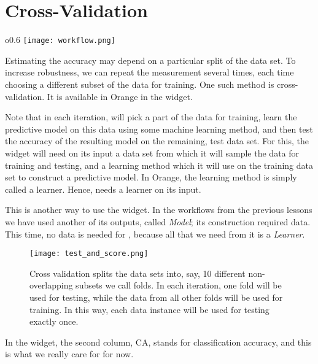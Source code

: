 \chapter{Cross-Validation}

\begin{wrapfigure}{o}{0.6\textwidth}
    \vspace{-0.5cm}
    \texttt{[image: workflow.png]}
\end{wrapfigure}

Estimating the accuracy may depend on a particular split of the data set. To increase robustness, we can repeat the measurement several times, each time choosing a different subset of the data for training. One such method is cross-validation. It is available in Orange in the  widget.

Note that in each iteration,  will pick a part of the data for training, learn the predictive model on this data using some machine learning method, and then test the accuracy of the resulting model on the remaining, test data set. For this, the widget will need on its input a data set from which it will sample the data for training and testing, and a learning method which it will use on the training data set to construct a predictive model. In Orange, the learning method is simply called a learner. Hence,  needs a learner on its input. 

This is another way to use the  widget. In the workflows from the previous lessons we have used another of its outputs, called \textit{Model}; its construction required data. This time, no data is needed for , because all that we need from it is a \textit{Learner}.

\begin{figure}[h]
    \centering
    \texttt{[image: test\_and\_score.png]}
    \caption{Cross validation splits the data sets into, say, 10 different non-overlapping subsets we call folds. In each iteration, one fold will be used for testing, while the data from all other folds will be used for training. In this way, each data instance will be used for testing exactly once.}
\end{figure}

In the  widget, the second column, CA, stands for classification accuracy, and this is what we really care for for now.
